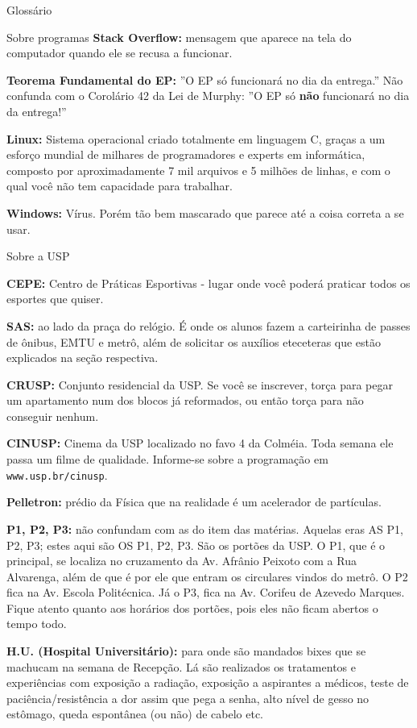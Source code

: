 \begin{secao}{Glossário}
\begin{subsecao}{Sobre programas}
{\bf Stack Overflow:} mensagem que aparece na tela do computador
quando ele se recusa a funcionar.

{\bf Teorema Fundamental do EP:} ''O EP só funcionará no dia da entrega.'' Não
confunda com o Corolário 42 da Lei de Murphy: ''O EP só {\bf não} funcionará no
dia da entrega!''

{\bf Linux:} Sistema operacional criado totalmente em linguagem C, graças a um
esforço mundial de milhares de programadores e experts em informática, composto
por aproximadamente 7 mil arquivos e 5 milhões de linhas, e com o qual você não
tem capacidade para trabalhar.

{\bf Windows:} Vírus. Porém tão bem mascarado que parece até a coisa correta a
se usar.
\end{subsecao}

\begin{subsecao}{Sobre a USP}

{\bf CEPE:} Centro de Práticas Esportivas - lugar onde você poderá praticar
todos os esportes que quiser.

{\bf SAS:} ao lado da praça do relógio. É onde os alunos fazem a carteirinha
de passes de ônibus, EMTU e metrô, além de solicitar os auxílios eteceteras que
estão explicados na seção respectiva.

{\bf CRUSP:} Conjunto residencial da USP. Se você se inscrever, torça para
pegar um apartamento num dos blocos já reformados, ou então torça para não
conseguir nenhum.



{\bf CINUSP:} Cinema da USP localizado no favo 4 da Colméia. Toda semana ele
passa um filme de qualidade. Informe-se sobre a programação em {\tt www.usp.br/cinusp}.

{\bf Pelletron:} prédio da Física que na realidade é um acelerador de
partículas.

{\bf P1, P2, P3:} não confundam com as do item das matérias. Aquelas eras AS P1, P2, P3;
estes aqui são OS P1, P2, P3. São os portões da USP. O P1, que é o principal, se localiza
no cruzamento da Av. Afrânio Peixoto com a Rua Alvarenga, além de que é por ele que
entram os circulares vindos do metrô. O P2 fica na Av. Escola Politécnica. Já o P3,
fica na Av. Corifeu de Azevedo Marques. Fique atento quanto aos horários dos portões,
pois eles não ficam abertos o tempo todo.

{\bf H.U. (Hospital Universitário):} para onde são mandados bixes que se machucam na semana de Recepção.
Lá são realizados os tratamentos e experiências com
exposição a radiação, exposição a aspirantes a médicos, teste de
paciência/resistência a dor assim que pega a senha, alto nível de gesso no
estômago, queda espontânea (ou não) de cabelo etc.


\end{subsecao}
\end{secao}
